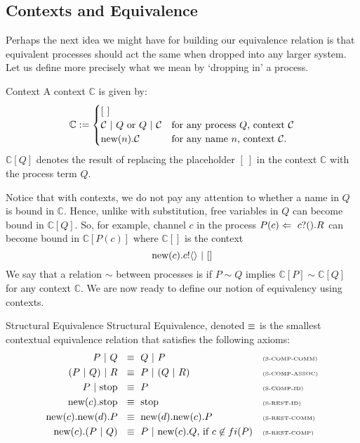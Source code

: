 \subsection{Contexts and Equivalence}
Perhaps the next idea we might have for building our equivalence relation is that equivalent processes should act the same when dropped into any larger system.  
Let us define more precisely what we mean by `dropping in' a process.
\begin{definition}{Context}
	A context $\mathbb{C}$ is given by:
	\[
		\mathbb{C} := \begin{cases}
		[\ ]\\
		\mathcal{C} \ |\  Q \text{ or } Q \ |\  \mathcal{C} & \text{for any process $Q$, context $\mathcal{C}$}\\
		\text{new}({n}).\mathcal{C} & \text{for any name $n$, context $\mathcal{C}$}.
		\end{cases}
	\]
	$\mathbb{C}[Q]$ denotes the result of replacing the placeholder $[\ ]$ in the context $\mathbb{C}$ with the process term $Q$.
	\end{definition}
	Notice that with contexts, we do not pay any attention to whether a name in $Q$ is bound in $\mathbb{C}$.  
Hence, unlike with substitution, free variables in $Q$ can become bound in $\mathbb{C}[Q]$.  
So, for example, channel $c$ in the process $P(c) \Leftarrow\  {c}?({}).R$ can become bound in $\mathbb{C}[P(c)]$ where $\mathbb{C}[]$ is the context
\[
	\text{new}({c}).{c}!\langle{}\rangle \ |\  []
\]
We say that a relation $\sim$ between processes is  if $P\sim Q$ implies $\mathbb{C}[P]\sim \mathbb{C}[Q]$ for any context $\mathbb{C}$.  
We are now ready to define our notion of equivalency using contexts.
	\begin{definition}{Structural Equivalence}
		Structural Equivalence, denoted $\equiv$ is the smallest contextual equivalence relation that satisfies the following axioms:
		\begin{align*}
			P \ |\  Q\ &\  \equiv\  Q \ |\  P && \text{\tiny{(S-COMP-COMM)}}\\
		 	(P \ |\  Q) \ |\  R\ &\ \equiv\ P \ |\  (Q \ |\  R) && \text{\tiny{(S-COMP-ASSOC)}}\\
			P \ |\  \text{stop}\ &\ \equiv\ P && \text{\tiny{(S-COMP-ID)}}\\
			\text{new}({c}). \text{stop}\ &\ \equiv\ \text{stop} && \text{\tiny{(S-REST-ID)}}\\
			\text{new}({c}).\text{new}({d}). P \ &\ \equiv\ \text{new}({d}).\text{new}({c}). P && \text{\tiny{(S-REST-COMM)}}\\
			\text{new}({c}).(P \ |\  Q)\ &\ \equiv\  P \ |\  \text{new}({c}).Q\text{, if } c\not\in fi(P) && \text{\tiny{(S-REST-COMP)}}
		\end{align*}
	\end{definition}
